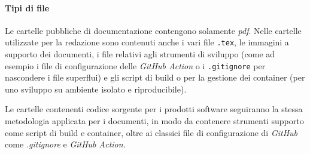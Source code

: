         \paragraph{Tipi di file}
        Le cartelle pubbliche di documentazione contengono solamente \textit{pdf}. Nelle cartelle utilizzate per la redazione sono contenuti anche i vari file \texttt{.tex}, le immagini a supporto dei documenti, i file relativi agli strumenti di sviluppo (come ad esempio i file di configurazione delle \textit{GitHub Action} o i \texttt{.gitignore} per nascondere i file superflui) e gli script di build o per la gestione dei container (per uno sviluppo su ambiente isolato e riproducibile).

        Le cartelle contenenti codice sorgente per i prodotti software seguiranno la stessa metodologia applicata per i documenti, in modo da contenere strumenti supporto come script di build e container, oltre ai classici file di configurazione di \textit{GitHub} come \textit{.gitignore} e \textit{GitHub Action}.


